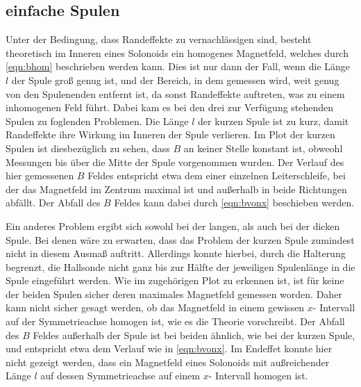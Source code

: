     \subsection{einfache Spulen}
        Unter der Bedingung, dass Randeffekte zu vernachlässigen sind, besteht theoretisch im Inneren eines Solonoids ein
        homogenes Magnetfeld, welches durch \ref{eqn:bhom} beschrieben werden kann. Dies ist nur dann der Fall, wenn die Länge $l$
        der Spule groß genug ist, und der Bereich, in dem gemessen wird, weit genug von den Spulenenden entfernt ist, da sonst
        Randeffekte auftreten, was zu einem inhomogenen Feld führt. Dabei kam es bei den drei zur Verfügung stehenden Spulen zu
        foglenden Problemen. Die Länge $l$ der kurzen Spule ist zu kurz, damit Randeffekte ihre Wirkung im Inneren der Spule verlieren.
        Im Plot der kurzen Spulen ist diesbezüglich zu sehen, dass $B$ an keiner Stelle konstant ist, obweohl Messungen bis über die
        Mitte der Spule vorgenommen wurden. Der Verlauf des hier gemessenen $B$ Feldes entspricht etwa dem einer einzelnen Leiterschleife,
        bei der das Magnetfeld im Zentrum maximal ist und außerhalb in beide Richtungen abfällt. Der Abfall des $B$ Feldes kann dabei
        durch \ref{eqn:bvonx} beschieben werden. 

        Ein anderes Problem ergibt sich sowohl bei der langen, als auch bei der dicken Spule. Bei denen wäre zu erwarten, dass 
        das Problem der kurzen Spule zumindest nicht in diesem Ausmaß auftritt. Allerdings konnte hierbei, durch die Halterung begrenzt,
        die Hallsonde nicht ganz bis zur Hälfte der jeweiligen Spulenlänge in die Spule eingeführt werden. Wie im zugehörigen Plot
        zu erkennen ist, ist für keine der beiden Spulen sicher deren maximales Magnetfeld gemessen worden. Daher kann nicht sicher 
        gesagt werden, ob das Magnetfeld in einem gewissen $x$- Intervall auf der Symmetrieachse homogen ist, wie es die Theorie vorschreibt.
        Der Abfall des $B$ Feldes außerhalb der Spule ist bei beiden ähnlich, wie bei der kurzen Spule, und entspricht etwa dem Verlauf
        wie in \ref{eqn:bvonx}. 
        Im Endeffet konnte hier nicht gezeigt werden, dass ein Magnetfeld eines Solonoids mit außreichender Länge $l$ auf dessen
        Symmetrieachse auf einem $x$- Intervall homogen ist. 

